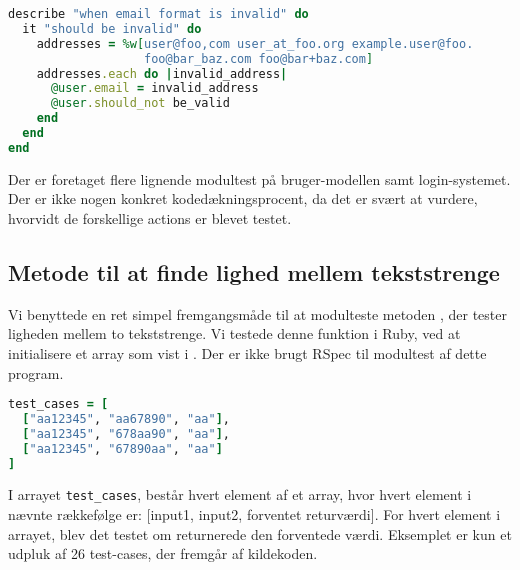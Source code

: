 \begin{lstlisting}[caption={Modultest af en brugers email er valid, når han/hun opretter sig som bruger},label=lst:email,language=Ruby]
describe "when email format is invalid" do
  it "should be invalid" do
    addresses = %w[user@foo,com user_at_foo.org example.user@foo.
                   foo@bar_baz.com foo@bar+baz.com]
    addresses.each do |invalid_address|
      @user.email = invalid_address
      @user.should_not be_valid
    end
  end
end
\end{lstlisting}

Der er foretaget flere lignende modultest på bruger-modellen samt login-systemet. Der er ikke nogen konkret kodedækningsprocent, da det er svært at vurdere, hvorvidt de forskellige actions er blevet testet.

\subsection{Metode til at finde lighed mellem tekststrenge}
Vi benyttede en ret simpel fremgangsmåde til at modulteste metoden , der tester ligheden mellem to tekststrenge. Vi testede denne funktion i Ruby, ved at initialisere et array som vist i . Der er ikke brugt RSpec til modultest af dette program.

\begin{lstlisting}[caption={Et eksempel på en række testcases til brug ved modultest.},label=lst:testcases,language=Ruby]
test_cases = [
  ["aa12345", "aa67890", "aa"],
  ["aa12345", "678aa90", "aa"],
  ["aa12345", "67890aa", "aa"]
]
\end{lstlisting}

I arrayet \texttt{test\_cases}, består hvert element af et array, hvor hvert element i nævnte rækkefølge er: [input1, input2, forventet returværdi].
For hvert element i arrayet, blev det testet om  returnerede den forventede værdi. Eksemplet er kun et udpluk af 26 test-cases, der fremgår af kildekoden.
